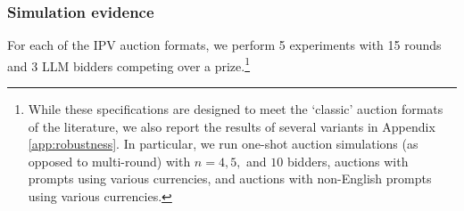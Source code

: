 \documentclass{article} %
\begin{document}



\subsubsection{Simulation evidence}

For each of the IPV auction formats, we perform 5 experiments with 15 rounds and 3 LLM bidders competing over a prize.\footnote{While these specifications are designed to meet the `classic' auction formats of the literature, we also report the results of several variants in Appendix \ref{app:robustness}. In particular, we run one-shot auction simulations (as opposed to multi-round) with $n = 4, 5,$ and $10$ bidders, auctions with prompts using various currencies, and auctions with non-English prompts using various currencies.}
\end{document}
